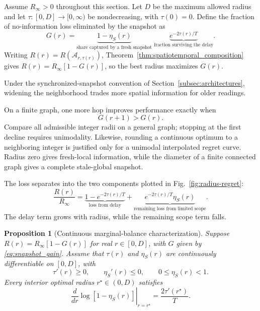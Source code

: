 \documentclass[11pt]{article}
\newtheorem{proposition}{Proposition}
\begin{document}
Assume $R_\infty>0$ throughout this section. Let $D$ be the maximum allowed radius and let
$\tau:[0,D]\to[0,\infty)$ be nondecreasing, with $\tau(0)=0$.
Define the fraction of no-information loss eliminated by the snapshot as
\begin{equation}
G(r)=\underbrace{1-\eta_S(r)}_{\text{share captured by a fresh snapshot}}
     \;\underbrace{e^{-2\tau(r)/T}}_{\text{fraction surviving the delay}}.
\label{eq:snapshot_gain}
\end{equation}
Writing $R(r)=R(\mathcal A_{r,\tau(r)})$,
Theorem~\ref{thm:spatiotemporal_composition} gives
$R(r)=R_\infty[1-G(r)]$, so the best radius maximizes $G(r)$.

Under the synchronized-snapshot convention of Section~\ref{subsec:architectures}, widening the neighborhood trades more spatial information for older readings.

On a finite graph, one more hop improves performance exactly when
\begin{equation}
G(r+1)>G(r).
\label{eq:discrete_radius_improvement}
\end{equation}
Compare all admissible integer radii on a general graph; stopping at the
first decline requires unimodality. Likewise, rounding a continuous optimum
to a neighboring integer is justified only for a unimodal interpolated
regret curve. Radius zero gives fresh-local information, while the diameter
of a finite connected graph gives a complete stale-global snapshot.

The loss separates into the two components plotted in
Fig.~\ref{fig:radius-regret}:
\begin{equation}
\frac{R(r)}{R_\infty}
=\underbrace{1-e^{-2\tau(r)/T}}_{\text{loss from delay}}
+\underbrace{e^{-2\tau(r)/T}\eta_S(r)}_{\text{remaining loss from limited scope}}.
\label{eq:R_decomposition}
\end{equation}
The delay term grows with radius, while the remaining scope term falls.

\begin{proposition}[Continuous marginal-balance characterization]
\label{thm:marginal_balance}
Suppose $R(r)=R_\infty[1-G(r)]$ for real $r\in[0,D]$, with $G$
given by \eqref{eq:snapshot_gain}. Assume that
$\tau(r)$ and $\eta_S(r)$ are continuously differentiable on $[0,D]$, with
\[
    \tau'(r)\ge0,\qquad \eta_S'(r)\le0,\qquad 0\le\eta_S(r)<1.
\]
Every interior optimal radius $r^\star\in(0,D)$ satisfies
\begin{equation}
\left.\frac{d}{dr}\log[1-\eta_S(r)]\right|_{r=r^\star}
=\frac{2\tau'(r^\star)}{T}.
\label{eq:marginal_balance_condition}
\end{equation}
\end{proposition}
\end{document}
